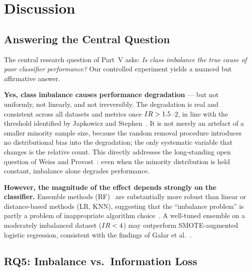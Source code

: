 
\chapter{Discussion}
\label{ch:discussion}

\section{Answering the Central Question}
\label{sec:disc:central}

The central research question of Part~V asks: \emph{Is class imbalance the true cause of poor classifier performance?}
Our controlled experiment yields a nuanced but affirmative answer.

\textbf{Yes, class imbalance causes performance degradation} --- but not uniformly, not linearly, and not irreversibly.
The degradation is real and consistent across all datasets and metrics once $IR > 1.5$--$2$, in line with the threshold identified by Japkowicz and Stephen~\cite{japkowicz2002class}.
It is not merely an artefact of a smaller minority sample size, because the random removal procedure introduces no distributional bias into the degradation; the only systematic variable that changes is the relative count.
This directly addresses the long-standing open question of Weiss and Provost~\cite{weiss2003effect}: even when the minority distribution is held constant, imbalance alone degrades performance.

\textbf{However, the magnitude of the effect depends strongly on the classifier.}
Ensemble methods (RF)~\cite{breiman2001random, galar2012review} are substantially more robust than linear or distance-based methods (LR, KNN), suggesting that the ``imbalance problem'' is partly a problem of inappropriate algorithm choice~\cite{ling2004exploration}.
A well-tuned ensemble on a moderately imbalanced dataset ($IR < 4$) may outperform SMOTE-augmented logistic regression, consistent with the findings of Galar et al.~\cite{galar2012review}.


\section{RQ5: Imbalance vs.\ Information Loss}
\label{sec:disc:rq5}

